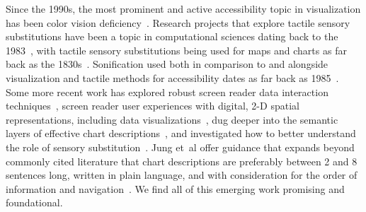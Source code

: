 \documentclass{egpubl}
\newcommand{\ea}{{et~al\xperiod}\xspace}
\begin{document}
Since the 1990s, the most prominent and active accessibility topic in visualization has been color vision deficiency~\cite{chaparro_applications_2017,nunez_optimizing_2018,oliveira_towards_2013,9023497,martinez_methodology_2021}. Research projects that explore tactile sensory substitutions have been a topic in computational sciences dating back to the 1983~\cite{geldard_tactual_1983}, with tactile sensory substitutions being used for maps and charts as far back as the 1830s~\cite{noauthor_extensive_2016}. Sonification used both in comparison to and alongside visualization and tactile methods for accessibility dates as far back as 1985~\cite{mansur_sound_1985,flowers_cross-modal_1997,brewster_visualization_2002,mcgookin_soundbar_2006,zhao_data_2008,cullen_co-designing_2019}. Some more recent work has explored robust screen reader data interaction techniques~\cite{miesenberger_accessible_2018,sorge_polyfilling_2016}, screen reader user experiences with digital, 2-D spatial representations, including data visualizations~\cite{schaadhardt_understanding_2021,sharif_understanding_2021}, dug deeper into the semantic layers of effective chart descriptions~\cite{lundgard_accessible_22}, and investigated how to better understand the role of sensory substitution~\cite{chundury_towards_2022}. Jung \ea offer guidance that expands beyond commonly cited literature that chart descriptions are preferably between 2 and 8 sentences long, written in plain language, and with consideration for the order of information and navigation~\cite{jung_communicating_2022}. We find all of this emerging work promising and foundational.
\end{document}
